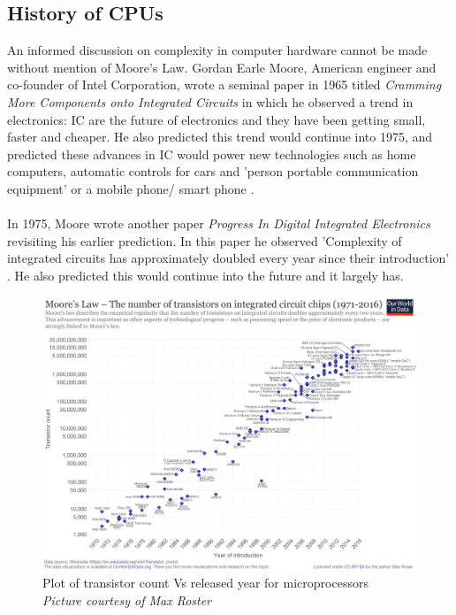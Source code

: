 \subsection{History of CPUs}
An informed discussion on complexity in computer hardware cannot be made without mention of Moore's Law.  Gordan Earle Moore, American engineer and co-founder of Intel Corporation, wrote a seminal paper in 1965 titled \textit{Cramming  More  Components  onto Integrated  Circuits} in which he observed a trend in electronics: IC are the future of electronics and they have been getting small, faster and cheaper. He also predicted this trend would continue into 1975, and predicted these advances in IC would power new technologies such as home computers, automatic controls for cars and 'person portable communication equipment' or a mobile phone/ smart phone \cite{moore65}. \\\\

In 1975, Moore wrote another paper \textit{Progress In Digital Integrated Electronics} revisiting his earlier prediction. In this paper he observed 'Complexity of integrated circuits has approximately doubled every year since their introduction' \cite{moore75}. He also predicted this would continue into the future and it largely has. 

\begin{figure} \begin{center}
\includegraphics[width=1\linewidth]{pics/moore_law} 
\end{center} 
\caption{Plot of transistor count Vs released year for microprocessors\\ \textit{\small{Picture courtesy of  Max Roster}}}
\end{figure}


